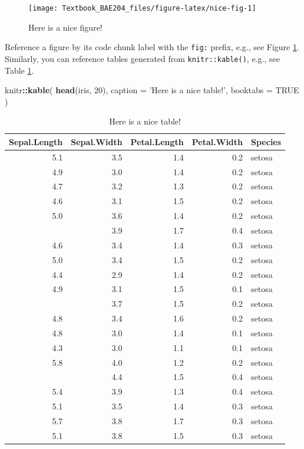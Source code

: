 \documentclass[]{book}
\newenvironment{Shaded}{\begin{snugshade}}{\end{snugshade}}
\newcommand{\KeywordTok}[1]{\textcolor[rgb]{0.13,0.29,0.53}{\textbf{#1}}}
\newcommand{\DataTypeTok}[1]{\textcolor[rgb]{0.13,0.29,0.53}{#1}}
\newcommand{\DecValTok}[1]{\textcolor[rgb]{0.00,0.00,0.81}{#1}}
\newcommand{\StringTok}[1]{\textcolor[rgb]{0.31,0.60,0.02}{#1}}
\newcommand{\OtherTok}[1]{\textcolor[rgb]{0.56,0.35,0.01}{#1}}
\newcommand{\OperatorTok}[1]{\textcolor[rgb]{0.81,0.36,0.00}{\textbf{#1}}}
\newcommand{\NormalTok}[1]{#1}
\theoremstyle{definition}
\theoremstyle{definition}
\theoremstyle{definition}
\theoremstyle{remark}
\begin{document}
\begin{figure}

{\centering \texttt{[image: Textbook\_BAE204\_files/figure-latex/nice-fig-1]} 

}

\caption{Here is a nice figure!}\label{fig:nice-fig}
\end{figure}

Reference a figure by its code chunk label with the \texttt{fig:}
prefix, e.g., see Figure \ref{fig:nice-fig}. Similarly, you can
reference tables generated from \texttt{knitr::kable()}, e.g., see Table
\ref{tab:nice-tab}.

\begin{Shaded}
\begin{Highlighting}[]
\NormalTok{knitr}\OperatorTok{::}\KeywordTok{kable}\NormalTok{(}
  \KeywordTok{head}\NormalTok{(iris, }\DecValTok{20}\NormalTok{), }\DataTypeTok{caption =} \StringTok{'Here is a nice table!'}\NormalTok{,}
  \DataTypeTok{booktabs =} \OtherTok{TRUE}
\NormalTok{)}
\end{Highlighting}
\end{Shaded}

\begin{table}

\caption{\label{tab:nice-tab}Here is a nice table!}
\centering
\begin{tabular}[t]{rrrrl}
\toprule
Sepal.Length & Sepal.Width & Petal.Length & Petal.Width & Species\\
\midrule
5.1 & 3.5 & 1.4 & 0.2 & setosa\\
4.9 & 3.0 & 1.4 & 0.2 & setosa\\
4.7 & 3.2 & 1.3 & 0.2 & setosa\\
4.6 & 3.1 & 1.5 & 0.2 & setosa\\
5.0 & 3.6 & 1.4 & 0.2 & setosa\\
\addlinespace
5.4 & 3.9 & 1.7 & 0.4 & setosa\\
4.6 & 3.4 & 1.4 & 0.3 & setosa\\
5.0 & 3.4 & 1.5 & 0.2 & setosa\\
4.4 & 2.9 & 1.4 & 0.2 & setosa\\
4.9 & 3.1 & 1.5 & 0.1 & setosa\\
\addlinespace
5.4 & 3.7 & 1.5 & 0.2 & setosa\\
4.8 & 3.4 & 1.6 & 0.2 & setosa\\
4.8 & 3.0 & 1.4 & 0.1 & setosa\\
4.3 & 3.0 & 1.1 & 0.1 & setosa\\
5.8 & 4.0 & 1.2 & 0.2 & setosa\\
\addlinespace
5.7 & 4.4 & 1.5 & 0.4 & setosa\\
5.4 & 3.9 & 1.3 & 0.4 & setosa\\
5.1 & 3.5 & 1.4 & 0.3 & setosa\\
5.7 & 3.8 & 1.7 & 0.3 & setosa\\
5.1 & 3.8 & 1.5 & 0.3 & setosa\\
\bottomrule
\end{tabular}
\end{table}
\end{document}
